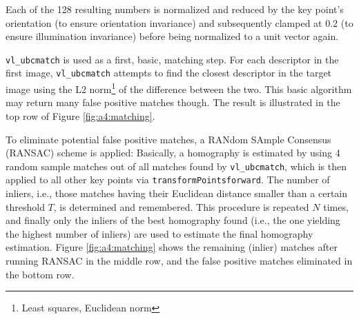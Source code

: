 Each of the 128 resulting numbers is normalized and reduced by the key point's orientation (to ensure orientation invariance) and subsequently clamped at 0.2 (to ensure illumination invariance) before being normalized to a unit vector again.

%

\texttt{vl\_ubcmatch} is used as a first, basic, matching step. For each descriptor in the first image, \texttt{vl\_ubc\-match} attempts to find the closest descriptor in the target image using the L2 norm\footnote{Least squares, Euclidean norm} of the difference between the two. This basic algorithm may return many false positive matches though. The result is illustrated in the top row of Figure \ref{fig:a4:matching}.

To eliminate potential false positive matches, a RANdom SAmple Consensus (RANSAC) \cite{Fischler81} scheme is applied: Basically, a homography is estimated by using 4 random sample matches out of all matches found by \texttt{vl\_ubcmatch}, which is then applied to all other key points via \texttt{transformPointsforward}. The number of inliers, i.e.,  those matches having their Euclidean distance smaller than a certain threshold $T$, is determined and remembered.
This procedure is repeated $N$ times, and finally only the inliers of the best homography found (i.e., the one yielding the highest number of inliers) are used to estimate the final homography estimation.
Figure \ref{fig:a4:matching} shows the remaining (inlier) matches after running RANSAC in the middle row, and the false positive matches eliminated in the bottom row.

